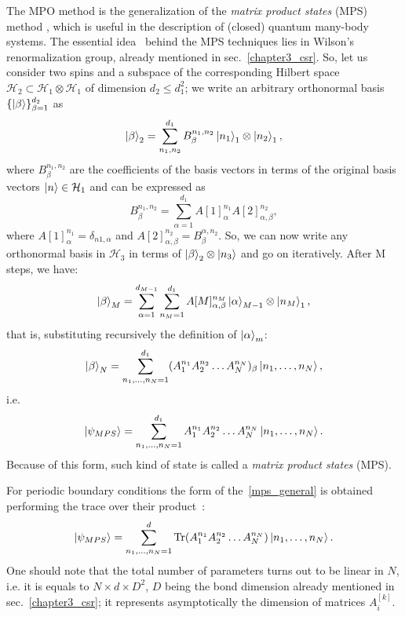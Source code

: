 The MPO method is the generalization of the \emph{matrix product states} (MPS) method \cite{SCHOLLWOCK201196}, which is useful in the description of (closed) quantum many-body systems. The essential idea~\cite{Cirac_2009} behind the MPS techniques lies in Wilson's renormalization group, already mentioned in sec.~\ref{chapter3_csr}.
So, let us consider two spins and a subspace of the corresponding Hilbert space $\mathcal{H}_2 \subset \mathcal{H}_1 \otimes \mathcal{H}_1$ of dimension $d_2 \leq d_1^2$; we write an arbitrary orthonormal basis $\{\ket{\beta}\}_{\beta=1}^{d_2}$ as
\begin{equation*}
    \ket{\beta}_2 = \sum_{n_1, n_2}^{d_{1}} B_\beta^{n_1, n_2} \ket{n_1}_1 \otimes \ket{n_2}_1,
\end{equation*}
where $B_\beta^{n_1, n_2}$ are the coefficients of the basis vectors in terms of the original basis vectors $\ket{n} \in \mathcal{H}_1$ and can be expressed as
\begin{equation*}
    B_\beta^{n_1, n_2} = \sum_{\alpha=1}^{d_{1}} A[1]_\alpha^{n_1}A[2]_{\alpha,\beta}^{n_2},
\end{equation*}
where $A[1]_\alpha^{n_1} = \delta_{n1, \alpha}$ and $A[2]_{\alpha,\beta}^{n_2} = B_\beta^{\alpha, n_2}$. So, we can now write any orthonormal basis in $\mathcal{H}_3$ in terms of $\ket{\beta}_2\otimes \ket{n_3}$ and go on iteratively. After M steps, we have:
\begin{equation*}
    \ket{\beta}_M = \sum_{\alpha=1}^{d_{M-1}}\sum_{n_M=1}^{d_1} A[M]_{\alpha,\beta}^{n_M}\ket{\alpha}_{M-1}\otimes\ket{n_M}_1,
\end{equation*}
that is, substituting recursively the definition of $\ket{\alpha}_m$:
\begin{equation*}
    \ket{\beta}_N = \sum_{n_1,\dots,n_N=1}^{d_1} (A_1^{n_1}A_2^{n_2}\dots A_N^{n_N})_\beta \ket{n_1,\dots,n_N},
\end{equation*}
i.e.
\begin{equation}
\label{mps_general}
    \ket{\psi_{MPS}} = \sum_{n_1,\dots,n_N=1}^{d_1} A_1^{n_1}A_2^{n_2}\dots A_N^{n_N} \ket{n_1,\dots,n_N}.
\end{equation}
Because of this form, such kind of state is called a \emph{matrix product states} (MPS). %

For periodic boundary conditions the form of the~\ref{mps_general} is obtained performing the trace over their product~\cite{SCHOLLWOCK201196, PhysRevLett.93.207204}:
\begin{equation}
    \ket{\psi_{MPS}} = \sum_{n_1,\dots,n_N=1}^{d} \operatorname{Tr}(A_1^{n_1}A_2^{n_2}\dots A_N^{n_N}) \ket{n_1,\dots,n_N}.
\end{equation}
One should note that the total number of parameters turns out to be linear in $N$, i.e. it is equals to $N \times d \times D^2$, $D$ being the bond dimension already mentioned in sec.~\ref{chapter3_csr}; it represents asymptotically the dimension of matrices $A_i^{[k]}$.

